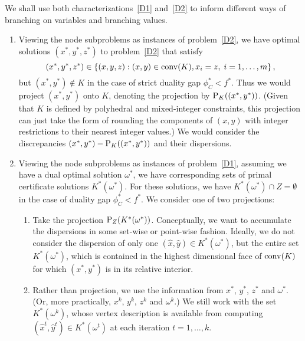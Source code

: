 We shall use both characterizations~\eqref{D1} and~\eqref{D2} to inform different ways of branching on variables and branching values. 
\begin{enumerate}
\item Viewing the node subproblems as instances of problem~\eqref{D2}, we have optimal solutions $(x^*,y^*,z^*)$ to problem~\eqref{D2} that satisfy 
$$(x^*,y^*,z^*) \in \left\{ (x,y,z) : (x,y) \in \operatorname{conv}(K), x_i=z,\; i=1,\dots,m \right \},$$ 
but $(x^*,y^*) \not\in K$ in the case of strict duality gap $\phi_C^* < f^*$. Thus we would project $(x^*,y^*)$ onto $K$, denoting the projection by $\text{P}_K((x^*,y^*))$. (Given that $K$ is defined by polyhedral and mixed-integer constraints, this projection can just take the form of rounding the components of $(x,y)$ with integer restrictions to their nearest integer values.) We would consider the discrepancies $(x^*,y^*) - \text{P}_K((x^*,y^*))$ and their dispersions. 
\item Viewing the node subproblems as instances of problem~\eqref{D1}, assuming we have a dual optimal solution $\omega^*$, we have corresponding sets of primal certificate solutions $K^*(\omega^*)$. For these solutions, we have $K^*(\omega^*) \cap  Z = \emptyset$ in the case of duality gap $\phi_C^* < f^*$. We consider one of two projections:
\begin{enumerate}
\item Take the projection $\text{P}_Z(K^*(\omega^*))$. Conceptually, we want to accumulate the dispersions in some set-wise or point-wise fashion.
Ideally, we do not consider the dispersion of only one $(\widehat{x},\widehat{y}) \in K^*(\omega^*)$, but the entire set $K^*(\omega^*)$, which is contained in the highest dimensional face of $\operatorname{conv}(K)$ for which $(x^*,y^*)$ is in its relative interior.
\item Rather than projection, we use the information from $x^*$, $y^*$, $z^*$ and $\omega^*$. (Or, more practically, $x^k$, $y^k$, $z^k$ and $\omega^k$.) We still work with the set $K^*(\omega^k)$, whose vertex description is available from computing $(\widehat{x}^t,\widehat{y}^t) \in K^*(\omega^t)$ at each iteration $t=1,\dots,k$.
\end{enumerate}
\end{enumerate}



